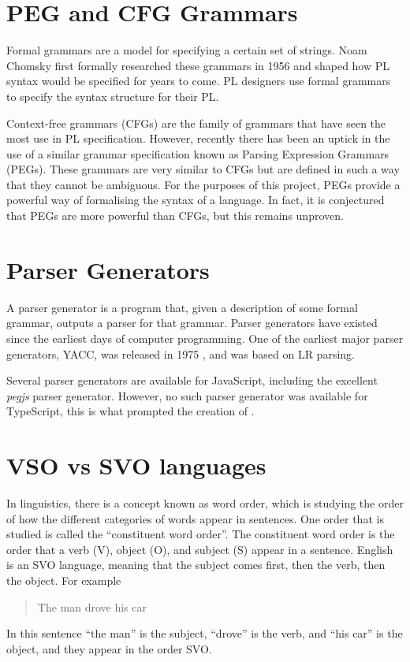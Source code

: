 \section{PEG and CFG Grammars}

Formal grammars are a model for specifying a certain set of strings. Noam Chomsky first formally researched these grammars in 1956\cite{chomskypaper} and shaped how PL syntax would be specified for years to come. PL designers use formal grammars to specify the syntax structure for their PL.

Context-free grammars (CFGs) are the family of grammars that have seen the most use in PL specification. However, recently there has been an uptick in the use of a similar grammar specification known as Parsing Expression Grammars (PEGs). These grammars are very similar to CFGs but are defined in such a way that they cannot be ambiguous.
For the purposes of this project, PEGs provide a powerful way of formalising the syntax of a language. In fact, it is conjectured that PEGs are more powerful than CFGs, but this remains unproven\cite{pegconjecture}.

\section{Parser Generators}

A parser generator is a program that, given a description of some formal grammar, outputs a parser for that grammar. Parser generators have existed since the earliest days of computer programming. One of the earliest major parser generators, YACC, was released in 1975 \cite{yacc}, and was based on LR parsing.

Several parser generators are available for JavaScript, including the excellent \emph{pegjs} parser generator. However, no such parser generator was available for TypeScript, this is what prompted the creation of \tsPEG{}.

\section{VSO vs SVO languages}\label{background:vsosvo}

In linguistics, there is a concept known as word order, which is studying the order of how the different categories of words appear in sentences. One order that is studied is called the ``constituent word order''. The constituent word order is the order that a verb (V), object (O), and subject (S) appear in a sentence\cite{wordorder}. English is an SVO language, meaning that the subject comes first, then the verb, then the object. For example
\begin{quote}
    The man drove his car
\end{quote}
In this sentence ``the man'' is the subject, ``drove'' is the verb, and ``his car'' is the object, and they appear in the order SVO.


